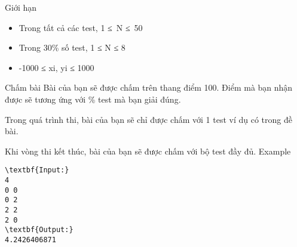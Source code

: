 Giới hạn
\begin{itemize}
	\item     Trong tất cả các test, 1 ≤ N ≤ 50   
	\item     Trong 30\% số test, 1 ≤ N ≤ 8   
	\item     -1000 ≤ xi, yi ≤ 1000   
\end{itemize}
Chấm bài
Bài của bạn sẽ được chấm trên thang điểm 100. Điểm mà bạn nhận được sẽ tương ứng với \% test mà bạn giải đúng.  

   Trong quá trình thi, bài của bạn sẽ chỉ được chấm với 1 test ví dụ có trong đề bài.  

   Khi vòng thi kết thúc, bài của bạn sẽ được chấm với bộ test đầy đủ.
Example
\begin{verbatim}
\textbf{Input:}
4
0 0
0 2
2 2
2 0
\textbf{Output:}
4.2426406871\end{verbatim}
